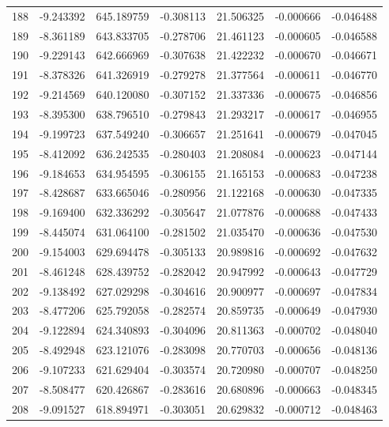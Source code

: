 \begin{tabular}{rrrrrrr}
 188 &  -9.243392 &  645.189759 & -0.308113 &   21.506325 &   -0.000666 & -0.046488 \\
 189 &  -8.361189 &  643.833705 & -0.278706 &   21.461123 &   -0.000605 & -0.046588 \\
 190 &  -9.229143 &  642.666969 & -0.307638 &   21.422232 &   -0.000670 & -0.046671 \\
 191 &  -8.378326 &  641.326919 & -0.279278 &   21.377564 &   -0.000611 & -0.046770 \\
 192 &  -9.214569 &  640.120080 & -0.307152 &   21.337336 &   -0.000675 & -0.046856 \\
 193 &  -8.395300 &  638.796510 & -0.279843 &   21.293217 &   -0.000617 & -0.046955 \\
 194 &  -9.199723 &  637.549240 & -0.306657 &   21.251641 &   -0.000679 & -0.047045 \\
 195 &  -8.412092 &  636.242535 & -0.280403 &   21.208084 &   -0.000623 & -0.047144 \\
 196 &  -9.184653 &  634.954595 & -0.306155 &   21.165153 &   -0.000683 & -0.047238 \\
 197 &  -8.428687 &  633.665046 & -0.280956 &   21.122168 &   -0.000630 & -0.047335 \\
 198 &  -9.169400 &  632.336292 & -0.305647 &   21.077876 &   -0.000688 & -0.047433 \\
 199 &  -8.445074 &  631.064100 & -0.281502 &   21.035470 &   -0.000636 & -0.047530 \\
 200 &  -9.154003 &  629.694478 & -0.305133 &   20.989816 &   -0.000692 & -0.047632 \\
 201 &  -8.461248 &  628.439752 & -0.282042 &   20.947992 &   -0.000643 & -0.047729 \\
 202 &  -9.138492 &  627.029298 & -0.304616 &   20.900977 &   -0.000697 & -0.047834 \\
 203 &  -8.477206 &  625.792058 & -0.282574 &   20.859735 &   -0.000649 & -0.047930 \\
 204 &  -9.122894 &  624.340893 & -0.304096 &   20.811363 &   -0.000702 & -0.048040 \\
 205 &  -8.492948 &  623.121076 & -0.283098 &   20.770703 &   -0.000656 & -0.048136 \\
 206 &  -9.107233 &  621.629404 & -0.303574 &   20.720980 &   -0.000707 & -0.048250 \\
 207 &  -8.508477 &  620.426867 & -0.283616 &   20.680896 &   -0.000663 & -0.048345 \\
 208 &  -9.091527 &  618.894971 & -0.303051 &   20.629832 &   -0.000712 & -0.048463 \\

\end{tabular}
